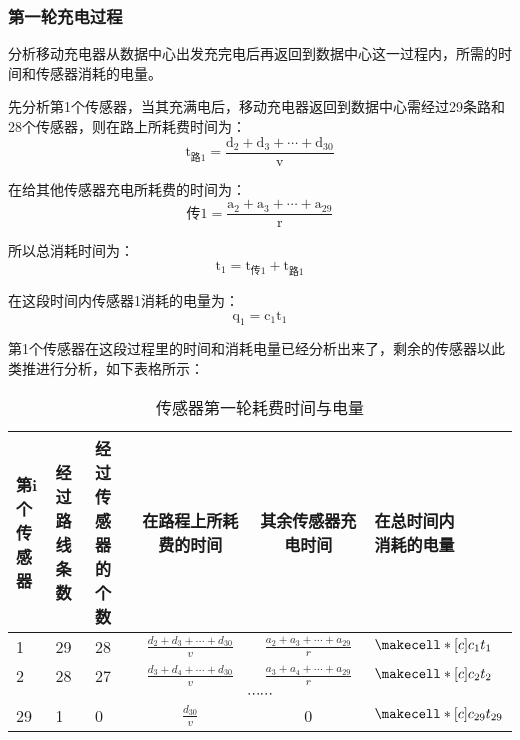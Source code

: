 \documentclass{article}
\begin{document}
\subsubsection{第一轮充电过程}
分析移动充电器从数据中心出发充完电后再返回到数据中心这一过程内，所需的时间和传感器消耗的电量\cite{ref5}。


先分析第1个传感器，当其充满电后，移动充电器返回到数据中心需经过29条路和28个传感器，则在路上所耗费时间为：
\begin{equation}
    \mathrm{t_{\text {路} 1}=\frac{d_{2}+d_{3}+\cdots+d_{30}}{v}}
    \tag{12}
\end{equation}

在给其他传感器充电所耗费的时间为：
\begin{equation}
    \mathrm{{\text {传} 1}=\frac{a_{2}+a_{3}+\cdots+a_{29}}{r}}
    \tag{13}
\end{equation}

所以总消耗时间为：
$$\mathrm{t_1=t_{\text {传1}}+t_{\text {路1}}}$$

在这段时间内传感器1消耗的电量为：
$$\mathrm{q_1=c_1 t_1}$$

第1个传感器在这段过程里的时间和消耗电量已经分析出来了，剩余的传感器以此类推进行分析，如下表格所示：
\vspace{1ex}
\begin{table}[h]
    \begin{center} 
        \begin{tabular}{|p{1.5cm}<{\centering}|p{1.5cm}<{\centering}|p{1.5cm}<{\centering}|c|c|p{2cm}<{\centering}|}
            \hline
            \makecell*[c]{第i个\\传感器} & \makecell*[c]{经过路\\线条数} & \makecell*[c]{经过传感\\器的个数}  & 在路程上所耗费的时间            & 其余传感器充电时间             & \makecell*[c]{在总时间内\\消耗的电量}  \\ 
            \hline
            1      & 29     & 28       & $\frac{d_{2}+d_{3}+\cdots+d_{30}}{v}$ & $\frac{a_{2}+a_{3}+\cdots+a_{29}}{r}$  &  $\makecell*[c]{c_1 t_1}$   \\ 
            \hline
            2      & 28     & 27       & $\frac{d_{3}+d_{4}+\cdots+d_{30}}{v}$ & $\frac{a_{3}+a_{4}+\cdots+a_{29}}{r}$  &  $\makecell*[c]{c_2 t_2}$  \\ 
            \hline
            \multicolumn{6}{|c|}{$\cdots \cdots$}                                                                 \\ 
            \hline
            29     & 1      & 0        & $\frac{d_{30}}{v}$     &  0  &  $\makecell*[c]{c_{29} t_{29}}$ \\
            \hline
        \end{tabular}
    \end{center}
\caption{传感器第一轮耗费时间与电量}
\end{table}
\end{document}
